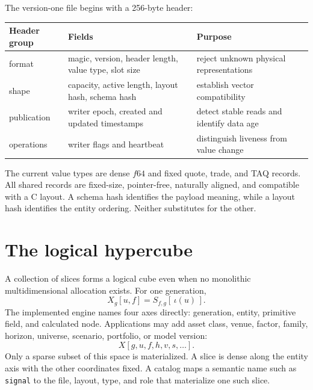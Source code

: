 \documentclass{strategynet-journal}
\begin{document}
The version-one file begins with a 256-byte header:
\begin{center}
\begin{tabularx}{\textwidth}{@{}p{}X X@{}}
\toprule
Header group & Fields & Purpose \\
\midrule
format & magic, version, header length, value type, slot size &
reject unknown physical representations \\
shape & capacity, active length, layout hash, schema hash &
establish vector compatibility \\
publication & writer epoch, created and updated timestamps &
detect stable reads and identify data age \\
operations & writer flags and heartbeat &
distinguish liveness from value change \\
\bottomrule
\end{tabularx}
\end{center}

The current value types are dense \(f64\) and fixed quote, trade, and TAQ
records.  All shared records are fixed-size, pointer-free, naturally aligned,
and compatible with a C layout.  A schema hash identifies the payload meaning,
while a layout hash identifies the entity ordering.  Neither substitutes
for the other.

\section{The logical hypercube}

A collection of slices forms a logical cube even when no monolithic
multidimensional allocation exists.  For one generation,
\[
  X_g[u,f]=S_{f,g}[\,\iota(u)\,].
\]
The implemented engine names four axes directly: generation, entity, primitive
field, and calculated node.  Applications may add asset class, venue, factor,
family, horizon, universe, scenario, portfolio, or model version:
\[
  X[g,u,f,h,v,s,\ldots].
\]
Only a sparse subset of this space is materialized.  A slice is dense along the entity
axis with the other coordinates fixed.  A catalog maps a semantic name such
as \texttt{signal} to the file, layout, type, and role that materialize one
such slice.
\end{document}
